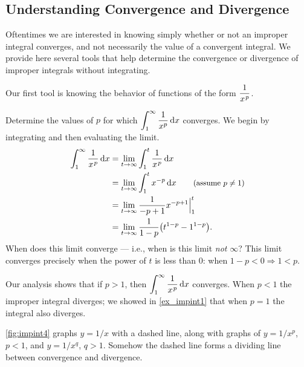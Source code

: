 \subsection{Understanding Convergence and Divergence}

Oftentimes we are interested in knowing simply whether or not an improper integral converges, and not necessarily the value of a convergent integral. We provide here several tools that help determine the convergence or divergence of improper integrals without integrating.

Our first tool is knowing the behavior of functions of the form $\dfrac1{x\primeskip^p}$.

\begin{example}\label{ex_impint4}%
Determine the values of $p$ for which $\displaystyle \int_1^\infty \frac1{x^p}\operatorname{d}\! x$ converges.
\solution
We begin by integrating and then evaluating the limit.
\begin{align*}
	\int_1^\infty \frac1{x\primeskip^p}\dd x
	&= \lim_{t\to\infty}\int_1^t\frac1{x\primeskip^p}\dd x\\
	&= \lim_{t\to\infty}\int_1^t x^{-p}\dd x \qquad \text{\small (assume $p\neq 1$)}\\
	&= \lim_{t\to\infty} \frac{1}{-p+1}x^{-p+1}\Big|_1^t\\
	&= \lim_{t\to\infty} \frac{1}{1-p}\bigl(t^{1-p}-1^{1-p}\bigr).\\
\end{align*}
When does this limit converge --- i.e., when is this limit \emph{not} $\infty$? This limit converges precisely when the power of $t$ is less than 0: when $1-p<0 \Rightarrow 1<p$. 

Our analysis shows that if $p>1$, then $\ds\int_1^\infty \frac1{x\primeskip^p}\dd x $ converges. When $p<1$ the improper integral diverges; we showed in \autoref{ex_impint1} that when $p=1$ the integral also diverges. 

\autoref{fig:impint4} graphs $y=1/x$ with a dashed line, along with graphs of $y=1/x^p$, $p<1$, and $y=1/x^q$, $q>1$. Somehow the dashed line forms a dividing line between convergence and divergence. %
\end{example}

